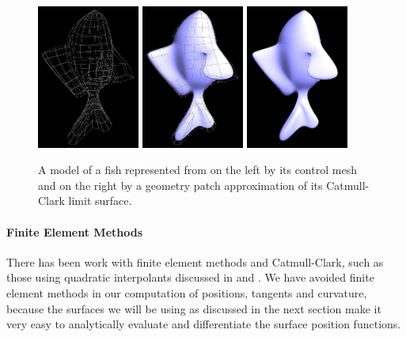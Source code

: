 \documentclass[12pt, letterpaper]{article}
\begin{document}
		\begin{figure}[h]
		\centering
		\includegraphics[width=0.3\textwidth]{fish_cm}
		\includegraphics[width=0.3\textwidth]{fish_cm_and_patch}
		\includegraphics[width=0.3\textwidth]{fish_patch}
		\caption{A model of a fish represented from on the left by its control mesh and on the right by a geometry patch approximation of its Catmull-Clark limit surface.}
		\label{fig:subDDef}
		\end{figure}

	\paragraph{Finite Element Methods}

		There has been work with finite element methods and Catmull-Clark, such as those using quadratic interpolants discussed in \cite{Zorin06} and \cite{PXXZ15}.
		We have avoided finite element methods in our computation of positions, tangents and curvature, because the surfaces we will be using as discussed in the next section
		make it very easy to analytically evaluate and differentiate the surface position functions.
\end{document}
